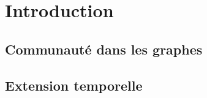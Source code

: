 \chapter{Introduction}
\minitoc
\section{Communauté dans les graphes}
\cite{Fortunato2010}
\section{Extension temporelle}